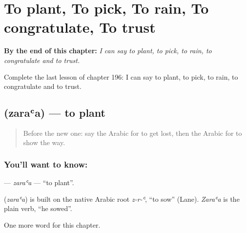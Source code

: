 
\chapter{To plant, To pick, To rain, To congratulate, To trust}
\label{ch:ar-to-plant-to-pick-to-rain-to-congratulate-to-trust}

\begin{chapteropening}
\textbf{By the end of this chapter:} \emph{I can say to plant, to pick, to rain, to congratulate and to trust.}

Complete the last lesson of chapter 196: I can say to plant, to pick, to rain, to congratulate and to trust.
\end{chapteropening}

\section[\texorpdfstring{\ar{زرع} (zaraʿa)}{زرع (zaraʿa)}]{ (zaraʿa) — to plant}

\label{lesson:AR-C196-zaraa}



\begin{quote}
Before the new one: say the Arabic for to get lost, then the Arabic for to show the way.
\end{quote}

\subsection*{You'll want to know: }
\textbf{} — \emph{zaraʿa} — \textquotedblleft{}to plant\textquotedblright{}.

\begin{cousinweb}
\textbf{} (\emph{zaraʿa}) is built on the native Arabic root \emph{z-r-ʿ}, \textquotedblleft{}to sow\textquotedblright{} (Lane). \emph{Zaraʿa} is the plain verb, \textquotedblleft{}he sowed\textquotedblright{}.
\end{cousinweb}

\begin{grammarlens}[title={What you've built}]
One more word for this chapter.
\end{grammarlens}

